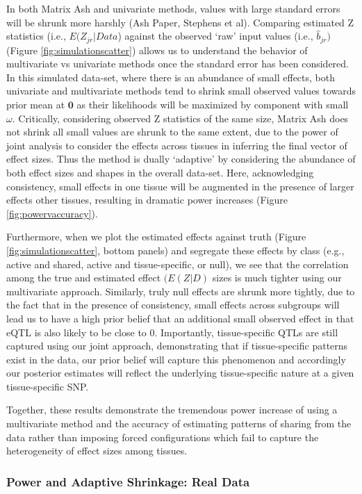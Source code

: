 In both Matrix Ash and univariate methods, values with large standard errors will be shrunk more harshly (Ash Paper, Stephens et al). Comparing estimated Z statistics (i.e., $E(Z_{jr}|Data$) against the observed `raw' input values (i.e., $\hat{b}_{jr})$ (Figure \ref{fig:simulationscatter}) allows us to understand the behavior of multivariate vs univariate methods once the standard error has been considered. In this simulated data-set, where there is an abundance of small effects, both univariate and multivariate methods tend to shrink small observed values towards prior mean at $\bm{0}$ as their likelihoods will be maximized by component with small $\omega$. Critically, considering observed Z statistics of the same size, Matrix Ash does not shrink all small values are shrunk to the same extent, due to the power of joint analysis to consider the effects across tissues in inferring the final vector of effect sizes. Thus the method is dually `adaptive' by considering the abundance of both effect sizes and shapes in the overall data-set.  Here, acknowledging consistency, small effects in one tissue will be augmented in the presence of larger effects  other tissues, resulting in dramatic power increases (Figure \ref{fig:powervaccuracy}).

Furthermore, when we plot the estimated effects against truth (Figure \ref{fig:simulationscatter}, bottom panels) and segregate these effects by class  (e.g., active and shared, active and tissue-specific, or null), we see that the correlation among the true and estimated effect $(E(Z|D)$ sizes is much tighter using our multivariate approach. Similarly, truly null effects are shrunk more tightly, due to the fact that in the presence of consistency, small effects across subgroups will lead us to have a high prior belief that an additional small observed effect in that eQTL is also likely to be close to 0. Importantly, tissue-specific QTLs are still captured using our joint approach, demonstrating that if tissue-specific patterns exist in the data, our prior belief will capture this phenomenon and accordingly our posterior estimates will reflect the underlying tissue-specific nature at a given tissue-specific SNP.

Together, these results demonstrate the tremendous power increase of using a multivariate method and the accuracy of estimating patterns of sharing from the data rather than imposing forced configurations which fail to capture the heterogeneity of effect sizes among tissues.


\subsubsection{Power and Adaptive Shrinkage: Real Data}

